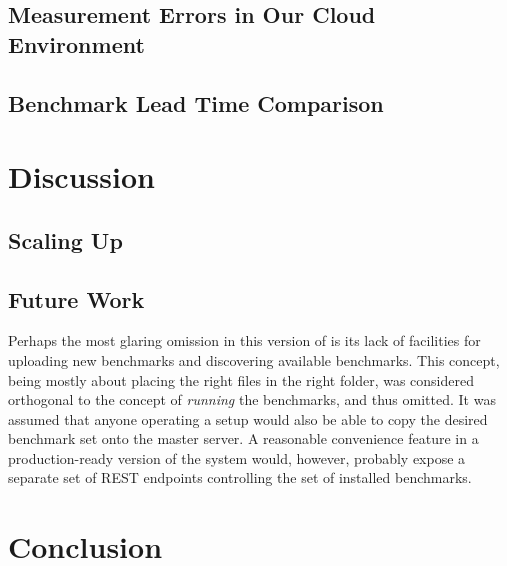 \documentclass[a4paper]{IEEEtran}
\begin{document}
\subsection{Measurement Errors in Our Cloud Environment}

\subsection{Benchmark Lead Time Comparison}


\section{Discussion}

\subsection{Scaling Up}

\subsection{Future Work}

Perhaps the most glaring omission in this version of \testbench{} is its lack of
facilities for uploading new benchmarks and discovering available benchmarks.
This concept, being mostly about placing the right files in the right folder,
was considered orthogonal to the concept of \emph{running} the benchmarks, and
thus omitted. It was assumed that anyone operating a \testbench{} setup would
also be able to copy the desired benchmark set onto the master server. A
reasonable convenience feature in a production-ready version of the system
would, however, probably expose a separate set of REST endpoints controlling the
set of installed benchmarks.

\section{Conclusion}

\fixme{\lipsum[100]}

\printbibliography
\end{document}
